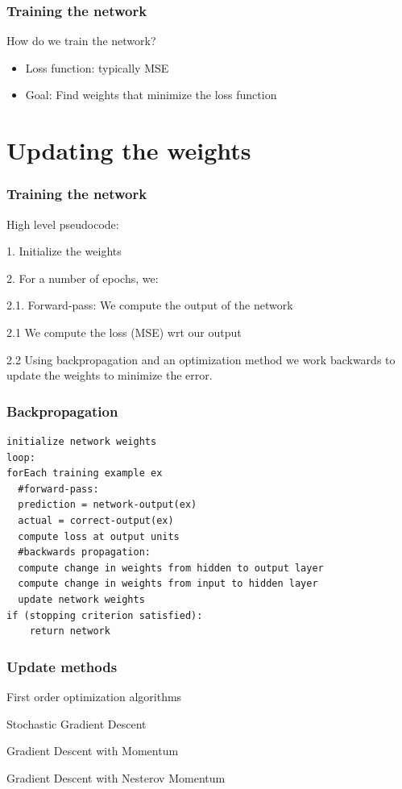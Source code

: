 \documentclass{beamer}
\begin{document}
\begin{frame}
    \frametitle{Training the network}
    \begin{block}{How do we train the network?}
    \begin{itemize}
    \item Loss function: typically MSE
    \item Goal: Find weights that minimize the loss function
    \end{itemize}
    \end{block}   
\end{frame}


\section{Updating the weights}
\begin{frame}
    \frametitle{Training the network}
    \begin{block}{High level pseudocode:}
        \item 1. Initialize the weights 
        \item 2. For a number of epochs, we:
        \item 2.1. Forward-pass: We compute the output of the network
        \item 2.1 We compute the loss (MSE) wrt our output
        \item 2.2 Using backpropagation and an optimization method we work backwards to update the weights to minimize the error. 
    \end{block}   
\end{frame}

\begin{frame}[fragile]
\frametitle{Backpropagation}
\begin{verbatim}
initialize network weights
loop:
forEach training example ex
  #forward-pass:
  prediction = network-output(ex)
  actual = correct-output(ex)
  compute loss at output units
  #backwards propagation:
  compute change in weights from hidden to output layer
  compute change in weights from input to hidden layer
  update network weights
if (stopping criterion satisfied):
    return network
\end{verbatim}
\end{frame}

\begin{frame}
    \frametitle{Update methods}
    \begin{block}{First order optimization algorithms}
    \item Stochastic Gradient Descent
    \item Gradient Descent with Momentum
    \item Gradient Descent with Nesterov Momentum
    \end{block}
\end{frame}
\end{document}
